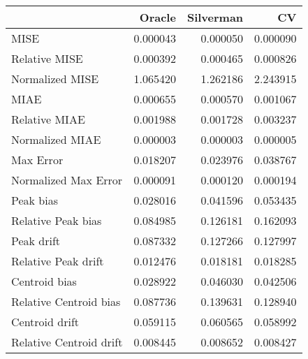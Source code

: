 \begin{tabular}{lrrr}
  \hline
 & Oracle & Silverman & CV \\ 
  \hline
MISE & 0.000043 & 0.000050 & 0.000090 \\ 
  Relative MISE & 0.000392 & 0.000465 & 0.000826 \\ 
  Normalized MISE & 1.065420 & 1.262186 & 2.243915 \\ 
  MIAE & 0.000655 & 0.000570 & 0.001067 \\ 
  Relative MIAE & 0.001988 & 0.001728 & 0.003237 \\ 
  Normalized MIAE & 0.000003 & 0.000003 & 0.000005 \\ 
  Max Error & 0.018207 & 0.023976 & 0.038767 \\ 
  Normalized Max Error & 0.000091 & 0.000120 & 0.000194 \\ 
  Peak bias & 0.028016 & 0.041596 & 0.053435 \\ 
  Relative Peak bias & 0.084985 & 0.126181 & 0.162093 \\ 
  Peak drift & 0.087332 & 0.127266 & 0.127997 \\ 
  Relative Peak drift & 0.012476 & 0.018181 & 0.018285 \\ 
  Centroid bias & 0.028922 & 0.046030 & 0.042506 \\ 
  Relative Centroid bias & 0.087736 & 0.139631 & 0.128940 \\ 
  Centroid drift & 0.059115 & 0.060565 & 0.058992 \\ 
  Relative Centroid drift & 0.008445 & 0.008652 & 0.008427 \\ 
   \hline
\end{tabular}
